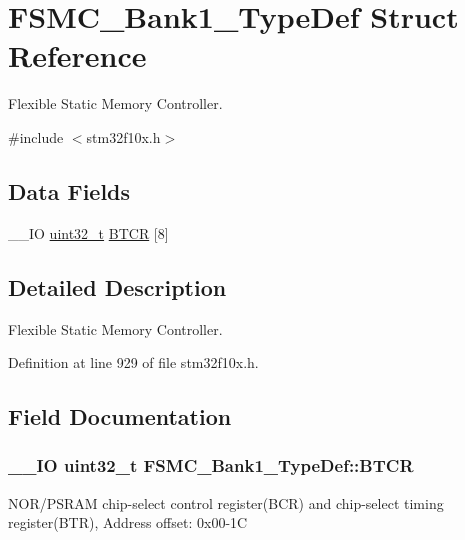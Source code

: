 \hypertarget{struct_f_s_m_c___bank1___type_def}{\section{F\-S\-M\-C\-\_\-\-Bank1\-\_\-\-Type\-Def Struct Reference}
\label{struct_f_s_m_c___bank1___type_def}
}


Flexible Static Memory Controller.  




{\ttfamily \#include $<$stm32f10x.\-h$>$}

\subsection*{Data Fields}
\begin{DoxyCompactItemize}
\item 
\-\_\-\-\_\-\-I\-O \hyperlink{stdint_8h_a435d1572bf3f880d55459d9805097f62}{uint32\-\_\-t} \hyperlink{struct_f_s_m_c___bank1___type_def_a3360341d4c7db502fea208cfb48638a3}{B\-T\-C\-R} \mbox{[}8\mbox{]}
\end{DoxyCompactItemize}


\subsection{Detailed Description}
Flexible Static Memory Controller. 

Definition at line 929 of file stm32f10x.\-h.



\subsection{Field Documentation}
\hypertarget{struct_f_s_m_c___bank1___type_def_a3360341d4c7db502fea208cfb48638a3}{
\subsubsection[{B\-T\-C\-R}]{\setlength{\rightskip}{0pt plus 5cm}\-\_\-\-\_\-\-I\-O {\bf uint32\-\_\-t} F\-S\-M\-C\-\_\-\-Bank1\-\_\-\-Type\-Def\-::\-B\-T\-C\-R}}\label{struct_f_s_m_c___bank1___type_def_a3360341d4c7db502fea208cfb48638a3}
N\-O\-R/\-P\-S\-R\-A\-M chip-\/select control register(\-B\-C\-R) and chip-\/select timing register(\-B\-T\-R), Address offset\-: 0x00-\/1\-C 

